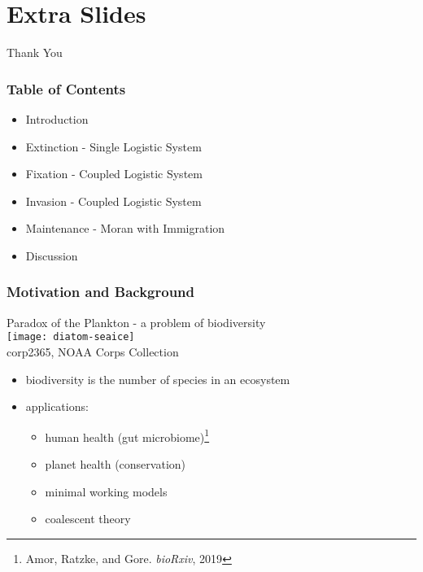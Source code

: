 \documentclass{beamer}
\begin{document}


\section*{Extra Slides}

\begin{frame}
\centering
{{\Huge Thank You}}
\end{frame}

\iffalse%

\begin{frame}
\frametitle{Table of Contents}
\begin{itemize}
	\item Introduction
	\item Extinction - Single Logistic System%
	\item Fixation - Coupled Logistic System%
	\item Invasion - Coupled Logistic System%
	\item Maintenance - Moran with Immigration
	\item Discussion
\end{itemize}
\end{frame}


\begin{frame}
\frametitle{Motivation and Background}
\begin{center}
	Paradox of the Plankton - a problem of biodiversity \\
	\texttt{[image: diatom-seaice]} \\
	\tiny{corp2365, NOAA Corps Collection}
\end{center}
\vspace{-0.5cm}
\begin{itemize}
	\item biodiversity is the number of species in an ecosystem
	\pause
	\item applications:
	\begin{itemize}
		\item human health (gut microbiome)\footnote{Amor, Ratzke, and Gore. \emph{bioRxiv}, 2019}
		\item planet health (conservation)
		\item minimal working models
		\item coalescent theory
	\end{itemize}
\end{itemize}
\end{frame}
\end{document}
